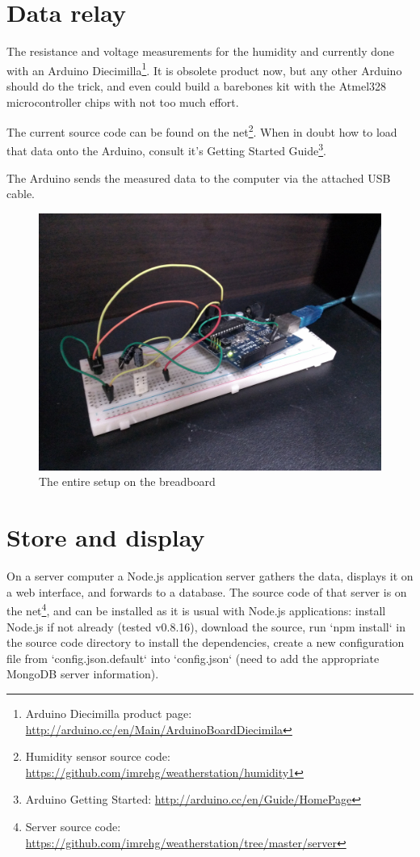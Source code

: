\documentclass[12pt,a4paper]{article}
\begin{document}
\section{Data relay}

The resistance and voltage measurements for the humidity and currently done with an Arduino Diecimilla\footnote{Arduino Diecimilla product page: \url{http://arduino.cc/en/Main/ArduinoBoardDiecimila}}. It is obsolete product now, but any other Arduino should do the trick, and even could build a barebones kit with the Atmel328 microcontroller chips with not too much effort.

The current source code can be found on the net\footnote{Humidity sensor source code: \url{https://github.com/imrehg/weatherstation/humidity1}}. When in doubt how to load that data onto the Arduino, consult it's Getting Started Guide\footnote{Arduino Getting Started: \url{http://arduino.cc/en/Guide/HomePage}}.

The Arduino sends the measured data to the computer via the attached USB cable.

\begin{figure}[ht!]
\centering
\includegraphics[width=140mm]{setup.jpg}
\caption{The entire setup on the breadboard}
\label{fig:setup}
\end{figure}

\section{Store and display}

On a server computer a Node.js application server gathers the data, displays it on a web interface, and forwards to a database. The source code of that server is on the net\footnote{Server source code: \url{https://github.com/imrehg/weatherstation/tree/master/server}}, and can be installed as it is usual with Node.js applications: install Node.js if not already (tested v0.8.16), download the source, run `npm install` in the source code directory to install the dependencies, create a new configuration file from `config.json.default` into `config.json` (need to add the appropriate MongoDB server information).
\end{document}
